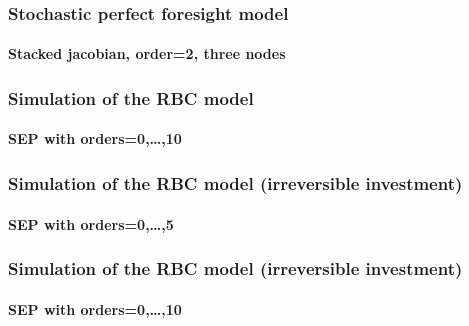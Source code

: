 \documentclass{beamer}
\begin{document}
\begin{frame}
    \frametitle{Stochastic perfect foresight model}
    \framesubtitle{Stacked jacobian, order=2, three nodes}
  \begin{center}
    \scalebox{.5}{
  }
  \end{center}

\end{frame}


\begin{frame}
    \frametitle{Simulation of the RBC model}
    \framesubtitle{SEP with orders=0,\dots,10}
  \begin{center}
    \scalebox{.5}{
  }
  \end{center}

\end{frame}


\begin{frame}
    \frametitle{Simulation of the RBC model (irreversible investment)}
    \framesubtitle{SEP with orders=0,\dots,5}
  \begin{center}
    \scalebox{.5}{
  }
  \end{center}

\end{frame}


\begin{frame}
    \frametitle{Simulation of the RBC model (irreversible investment)}
    \framesubtitle{SEP with orders=0,\dots,10}
  \begin{center}
    \scalebox{.5}{
  }
  \end{center}

\end{frame}
\end{document}
